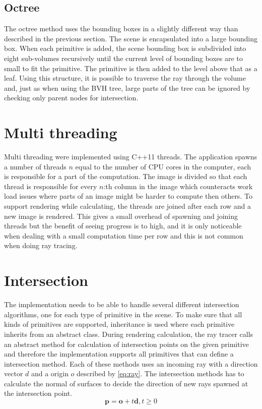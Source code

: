 \documentclass[a4paper, 12pt]{report}
\begin{document}
\subsection{Octree}
The octree method uses the bounding boxes in a slightly different way than described in the previous section.
The scene is encapsulated into a large bounding box.
When each primitive is added, the scene bounding box is subdivided into eight sub-volumes recursively until the current level of bounding boxes are to small to fit the primitive.
The primitive is then added to the level above that as a leaf.
Using this structure, it is possible to traverse the ray through the volume and, just as when using the BVH tree, large parts of the tree can be ignored by checking only parent nodes for intersection.

\section{Multi threading}
Multi threading were implemented using C++11 threads.
The application spawns a number of threads $ n $ equal to the number of CPU cores in the computer, each is responsible for a part of the computation.
The image is divided so that each thread is responsible for every $n$:th column in the image which counteracts work load issues where parts of an image might be harder to compute then others.
To support rendering while calculating, the threads are joined after each row and a new image is rendered.
This gives a small overhead of spawning and joining threads but the benefit of seeing progress is to high, and it is only noticeable when dealing with a small computation time per row and this is not common when doing ray tracing.

\section{Intersection}
The implementation needs to be able to handle several different intersection algorithms, one for each type of primitive in the scene.
To make sure that all kinds of primitives are supported, inheritance is used where each primitive inherits from an abstract class.
During rendering calculation, the ray tracer calls an abstract method for calculation of intersection points on the given primitive and therefore the implementation supports all primitives that can define a intersection method.
Each of these methods uses an incoming ray with a direction vector $d$ and a origin $o$ described by \autoref{eq:ray}.
The intersection methods has to calculate the normal of surfaces to decide the direction of new rays spawned at the intersection point.
\begin{equation} \label{eq:ray}
\mathbf{p} = \mathbf{o} + t \mathbf{d}, t \geq 0
\end{equation}
\end{document}
